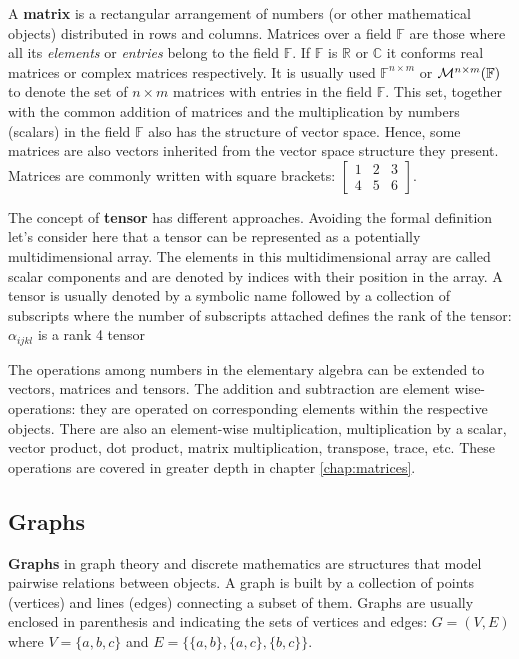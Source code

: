 A \textbf{matrix} is a rectangular arrangement of numbers (or other mathematical objects) distributed in rows and columns.
Matrices over a field $\mathbb{F}$ are those where all its \textit{elements} or \textit{entries} belong to the field $\mathbb{F}$.
If $\mathbb{F}$ is $\mathbb{R}$ or $\mathbb{C}$ it conforms real matrices or complex matrices respectively.
It is usually used $\mathbb{F}^{n\times m}$ or ${\cal{M}}^{n \times m} (\mathbb{F})$ to denote 
the set of $n\times m$ matrices with entries in the field $\mathbb{F}$. 
This set, together with the common addition of matrices and the multiplication by numbers (scalars) 
in the field $\mathbb{F}$ also has the structure of vector space. 
Hence, some matrices are also vectors inherited from the vector space structure they present.
Matrices are commonly written with square brackets: $\begin{bmatrix}  1 & 2 & 3 \\  4 & 5 & 6\end{bmatrix}$.

The concept of \textbf{tensor} has different approaches. 
Avoiding the formal definition let's consider here that a tensor can be represented as a potentially multidimensional array.
The elements in this multidimensional array are called scalar components and are denoted by indices with their position in the array.
A tensor is usually denoted by a symbolic name followed by a collection of subscripts where the number of subscripts attached defines the rank of the tensor: $\alpha_{ijkl}$ is a rank 4 tensor

The operations among numbers in the elementary algebra can be extended to vectors, matrices and tensors. 
The addition and subtraction are element wise-operations: 
they are operated on corresponding elements within the respective objects. 
There are also an element-wise multiplication, multiplication by a scalar, 
vector product, dot product, matrix multiplication, transpose, trace, etc.
These operations are covered in greater depth in chapter \ref{chap:matrices}.



        \subsection*{Graphs}
\textbf{Graphs} in graph theory and discrete mathematics are structures that model pairwise relations between objects. 
A graph is built by a collection of points (vertices) and lines (edges) connecting a subset of them.
Graphs are usually enclosed in parenthesis and indicating the sets of vertices and edges: $G = (V,E)$ where $V = \{a,b,c\}$ and $E = \{\{a,b\},\{a,c\},\{b,c\}\}$. 


